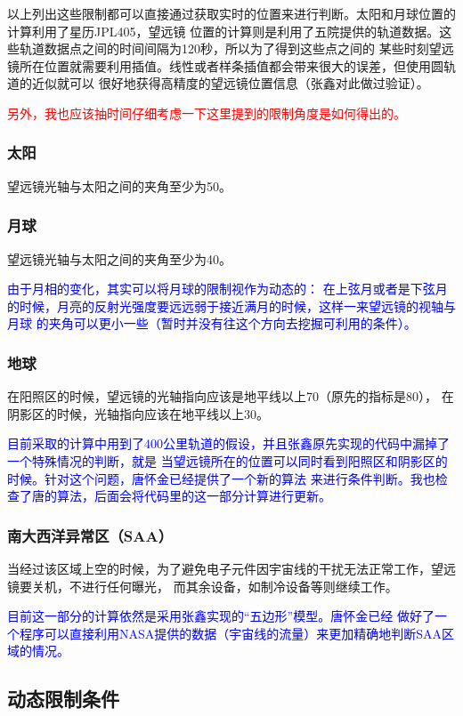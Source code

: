 \documentclass[a4paper,11pt]{ctexart}
\newcommand{\RT}[1]{\textcolor{red}{#1}}
\newcommand{\BT}[1]{\textcolor{blue}{#1}}
\begin{document}
以上列出这些限制都可以直接通过获取实时的位置来进行判断。太阳和月球位置的计算利用了星历JPL405，望远镜
位置的计算则是利用了五院提供的轨道数据。这些轨道数据点之间的时间间隔为120秒，所以为了得到这些点之间的
某些时刻望远镜所在位置就需要利用插值。线性或者样条插值都会带来很大的误差，但使用圆轨道的近似就可以
很好地获得高精度的望远镜位置信息（张鑫对此做过验证）。

\RT{另外，我也应该抽时间仔细考虑一下这里提到的限制角度是如何得出的。}

\subsubsection{太阳}
望远镜光轴与太阳之间的夹角至少为50\textdegree 。

\subsubsection{月球}
望远镜光轴与太阳之间的夹角至少为40\textdegree 。

\BT{\heiti 由于月相的变化，其实可以将月球的限制视作为动态的：
在上弦月或者是下弦月的时候，月亮的反射光强度要远远弱于接近满月的时候，这样一来望远镜的视轴与月球
的夹角可以更小一些（暂时并没有往这个方向去挖掘可利用的条件）。}

\subsubsection{地球}
在阳照区的时候，望远镜的光轴指向应该是地平线以上70\textdegree（原先的指标是80\textdegree），
在阴影区的时候，光轴指向应该在地平线以上30\textdegree 。

\BT{目前采取的计算中用到了400公里轨道的假设，并且张鑫原先实现的代码中漏掉了一个特殊情况的判断，就是
当望远镜所在的位置可以同时看到阳照区和阴影区的时候。针对这个问题，唐怀金已经提供了一个新的算法
来进行条件判断。我也检查了唐的算法，后面会将代码里的这一部分计算进行更新。}

\subsubsection{南大西洋异常区（SAA）}
当经过该区域上空的时候，为了避免电子元件因宇宙线的干扰无法正常工作，望远镜要关机，不进行任何曝光，
而其余设备，如制冷设备等则继续工作。

\BT{目前这一部分的计算依然是采用张鑫实现的“五边形”模型。唐怀金已经
做好了一个程序可以直接利用NASA提供的数据（宇宙线的流量）来更加精确地判断SAA区域的情况。}


\subsection{动态限制条件}
\end{document}
